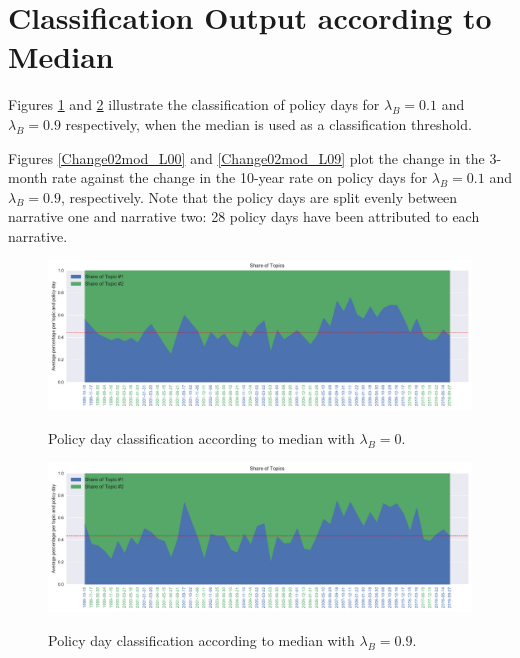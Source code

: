 \documentclass[11pt,a4paper,english,oneside]{book}
\numberwithin{equation}{chapter}
\begin{document}
\section{Classification Output according to Median}\label{AppendixE1}

Figures \ref{classPLSAmed} and \ref{classPLSAmed0_9} illustrate the classification of policy days for $\lambda_B = 0.1$ and $\lambda_B = 0.9$ respectively, when the median is used as a classification threshold. 

Figures \ref{Change02mod_L00} and \ref{Change02mod_L09} plot the change in the 3-month rate against the change in the 10-year rate on policy days for $\lambda_B = 0.1$ and $\lambda_B = 0.9$, respectively. Note that the policy days are split evenly between narrative one and narrative two: 28 policy days have been attributed to each narrative. 


\begin{figure}
	\caption{Policy day classification according to median with $\lambda_B = 0$.}
	\centering
	\includegraphics[scale=0.8]{Images/plsamodelling_bg_modLamb_0_0.pdf}
	\label{classPLSAmed}
\end{figure}


\begin{figure}
	\caption{Policy day classification according to median with $\lambda_B = 0.9$.}
	\centering
	\includegraphics[scale=0.8]{Images/plsamodelling_bg_modLamb_0_9.pdf}
	\label{classPLSAmed0_9}
\end{figure}
\end{document}
